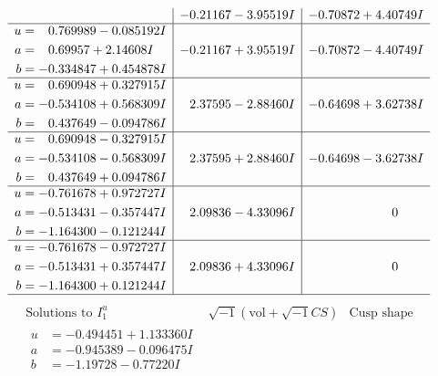 \documentclass[1p]{elsarticle_modified}
\theoremstyle{definition}
\newcommand{\I}{\sqrt{-1}}
\begin{document}
$$\begin{array}{c|c|c}
 & -0.21167 - 3.95519 I & -0.70872 + 4.40749 I \\ \hline\begin{aligned}
u &= \phantom{-}0.769989 - 0.085192 I \\
a &= \phantom{-}0.69957 + 2.14608 I \\
b &= -0.334847 + 0.454878 I\end{aligned}
 & -0.21167 + 3.95519 I & -0.70872 - 4.40749 I \\ \hline\begin{aligned}
u &= \phantom{-}0.690948 + 0.327915 I \\
a &= -0.534108 + 0.568309 I \\
b &= \phantom{-}0.437649 - 0.094786 I\end{aligned}
 & \phantom{-}2.37595 - 2.88460 I & -0.64698 + 3.62738 I \\ \hline\begin{aligned}
u &= \phantom{-}0.690948 - 0.327915 I \\
a &= -0.534108 - 0.568309 I \\
b &= \phantom{-}0.437649 + 0.094786 I\end{aligned}
 & \phantom{-}2.37595 + 2.88460 I & -0.64698 - 3.62738 I \\ \hline\begin{aligned}
u &= -0.761678 + 0.972727 I \\
a &= -0.513431 - 0.357447 I \\
b &= -1.164300 - 0.121244 I\end{aligned}
 & \phantom{-}2.09836 - 4.33096 I & \phantom{-0.000000 } 0 \\ \hline\begin{aligned}
u &= -0.761678 - 0.972727 I \\
a &= -0.513431 + 0.357447 I \\
b &= -1.164300 + 0.121244 I\end{aligned}
 & \phantom{-}2.09836 + 4.33096 I & \phantom{-0.000000 } 0\\
 \hline 
 \end{array}$$\newpage$$\begin{array}{c|c|c}  
\text{Solutions to }I^u_{1}& \I (\text{vol} + \sqrt{-1}CS) & \text{Cusp shape}\\
 \hline 
\begin{aligned}
u &= -0.494451 + 1.133360 I \\
a &= -0.945389 - 0.096475 I \\
b &= -1.19728 - 0.77220 I\end{aligned}

\end{array}$$
\end{document}
